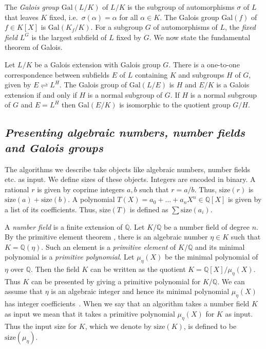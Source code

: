 \documentclass{llncs}
\newcommand{\size}[1]{{\ensuremath{\mathrm{size}\left(#1\right)}}}
\newcommand{\Gal}[1]{{\ensuremath{\mathrm{Gal}\left(#1\right)}}}
\newcommand{\Q}{\ensuremath{\mathbb{Q}}}
\begin{document}
The \emph{Galois group} $\Gal{L/K}$ of $L/K$ is the subgroup of
automorphisms $\sigma$ of $L$ that leaves $K$ fixed, i.e.\
$\sigma(\alpha) = \alpha$ for all $\alpha \in K$. The Galois group
$\Gal{f}$ of $f\in K[X]$ is $\Gal{K_f/K}$. For a subgroup $G$ of
automorphisms of $L$, the \emph{fixed field} $L^G$ is the largest
subfield of $L$ fixed by $G$.  We now state the fundamental theorem of
Galois.

\begin{theorem}{\rm{\cite[Theorem 1.1, Chapter
      VI]{lang:algebra}}}\label{thm-funda-galois} Let $L/K$ be a
  Galois extension with Galois group $G$. There is a one-to-one
  correspondence between subfields $E$ of $L$ containing $K$ and
  subgroups $H$ of $G$, given by $E \rightleftharpoons L^H$.  The
  Galois group of $\Gal{L/E}$ is $H$ and $E/K$ is a Galois extension
  if and only if $H$ is a normal subgroup of $G$. If $H$ is a normal
  subgroup of $G$ and $E = L^H$ then $\Gal{E/K}$ is isomorphic to the
  quotient group $G/H$.
\end{theorem}

\subsection{\it Presenting algebraic numbers, number fields and Galois
  groups}

The algorithms we describe take objects like algebraic numbers, number
fields etc. as input. We define sizes of these objects. Integers are
encoded in binary. A rational $r$ is given by coprime integers $a,b$
such that $r =a/b$. Thus, $\size{r}$ is $\size{a}+ \size{b}$.  A
polynomial $T(X) = a_0 + \ldots + a_n X^n \in\Q[X]$ is given by a list
of its coefficients. Thus, $\size{T}$ is defined as $\sum \size{a_i}$.


A \emph{number field} is a finite extension of $\Q$. Let $K/\Q$ be a
number field of degree $n$.  By the primitive element theorem
\cite[Theorem 4.6, Chapter V]{lang:algebra}, there is an algebraic
number $\eta\in K$ such that $K = \Q(\eta)$. Such an element is a
\emph{primitive element} of $K/\Q$ and its minimal polynomial is a
\emph{primitive polynomial}. Let $\mu_\eta(X)$ be the minimal
polynomial of $\eta$ over $\Q$. Then the field $K$ can be written as
the quotient $K=\Q[X]/\mu_\eta(X)$. Thus $K$ can be presented by
giving a primitive polynomial for $K/\Q$. We can assume that $\eta$ is
an algebraic integer and hence its minimal polynomial $\mu_\eta(X)$
has integer coefficients~\cite[Proposition 1.1, Chapter
VII]{lang:algebra}.  When we say that an algorithm takes a number
field $K$ as input we mean that it takes a primitive polynomial
$\mu_\eta(X)$ for $K$ as input. Thus the input size for $K$, which we
denote by $\size{K}$, is defined to be $\size{\mu_\eta}$.
\end{document}
